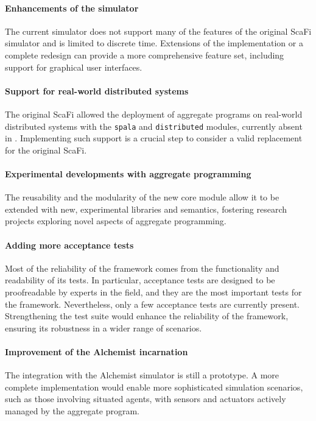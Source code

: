 \paragraph{Enhancements of the simulator} The current simulator does not support many of the features of the original ScaFi simulator and is limited to discrete time.
%
Extensions of the implementation or a complete redesign can provide a more comprehensive feature set, including support for graphical user interfaces.

\paragraph{Support for real-world distributed systems} The original ScaFi allowed the deployment of aggregate programs on real-world distributed systems with the \texttt{spala} and \texttt{distributed} modules, currently absent in \this.
%
Implementing such support is a crucial step to consider \this a valid replacement for the original ScaFi.

\paragraph{Experimental developments with aggregate programming} The reusability and the modularity of the new core module allow it to be extended with new, experimental libraries and semantics, fostering research projects exploring novel aspects of aggregate programming.

\paragraph{Adding more acceptance tests} Most of the reliability of the framework comes from the functionality and readability of its tests.
%
In particular, acceptance tests are designed to be proofreadable by experts in the field, and they are the most important tests for the framework.
%
Nevertheless, only a few acceptance tests are currently present.
%
Strengthening the test suite would enhance the reliability of the framework, ensuring its robustness in a wider range of scenarios.

\paragraph{Improvement of the Alchemist incarnation} The integration with the Alchemist simulator is still a prototype.
%
A more complete implementation would enable more sophisticated simulation scenarios, such as those involving situated agents, with sensors and actuators actively managed by the aggregate program.

